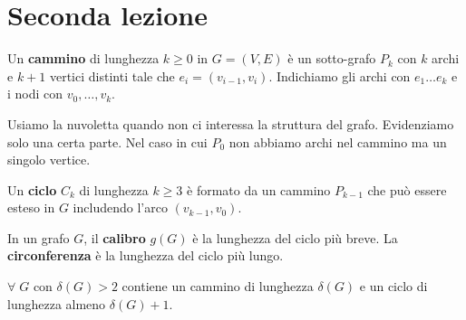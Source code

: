 \documentclass[12pt]{report}
\begin{document}
\chapter{Seconda lezione}

\noindent
Un \textbf{cammino} di lunghezza $k \geq 0$ in $G = (V,E)$ è un sotto-grafo $P_k$ con $k$ archi e $k+1$ vertici distinti tale che $e_i = (v_{i-1},v_i)$. Indichiamo gli archi con $e_1 \dots e_k$ e i nodi con $v_0,\dots,v_k$.


\noindent 
Usiamo la nuvoletta quando non ci interessa la struttura del grafo. Evidenziamo solo una certa parte.
Nel caso in cui $P_0$ non abbiamo archi nel cammino ma un singolo vertice.

Un \textbf{ciclo} $C_k$ di lunghezza $k \geq 3$ è formato da un cammino $P_{k-1}$ che può essere esteso in $G$ includendo l'arco $(v_{k-1},v_0)$.



\noindent 
In un grafo $G$, il \textbf{calibro} $g(G)$ è la lunghezza del ciclo più breve. La \textbf{circonferenza} è la lunghezza del ciclo più lungo. 

\begin{fatto}
    $\forall \; G$ con $\delta(G) > 2$ contiene un cammino di lunghezza $\delta(G)$ e un ciclo di lunghezza almeno $\delta(G) + 1$.
\end{fatto}
\end{document}
